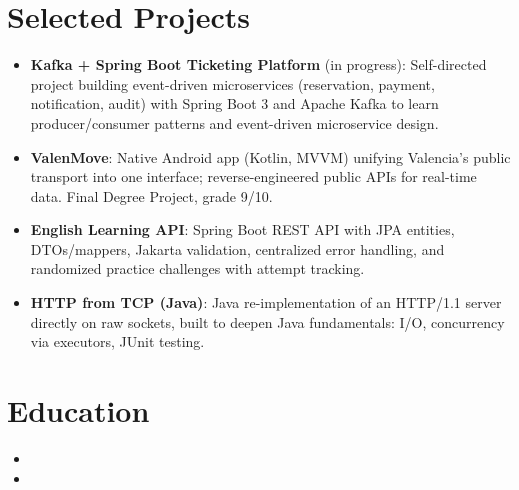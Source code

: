 \documentclass[11pt,a4paper,sans]{moderncv}
\begin{document}
\section{Selected Projects}
\vspace{1pt}
\begin{itemize}

\item \textbf{Kafka + Spring Boot Ticketing Platform} (in progress): Self-directed project building event-driven microservices (reservation, payment, notification, audit) with Spring Boot 3 and Apache Kafka to learn producer/consumer patterns and event-driven microservice design.

\item \textbf{ValenMove}: Native Android app (Kotlin, MVVM) unifying Valencia's public transport into one interface; reverse-engineered public APIs for real-time data. Final Degree Project, grade 9/10.

\item \textbf{English Learning API}: Spring Boot REST API with JPA entities, DTOs/mappers, Jakarta validation, centralized error handling, and randomized practice challenges with attempt tracking.

\item \textbf{HTTP from TCP (Java)}: Java re-implementation of an HTTP/1.1 server directly on raw sockets, built to deepen Java fundamentals: I/O, concurrency via executors, JUnit testing.

\end{itemize}


\section{Education}
\vspace{1pt}
\begin{itemize}

\item{}

\vspace{3pt}

\item{}

\end{itemize}
\end{document}
